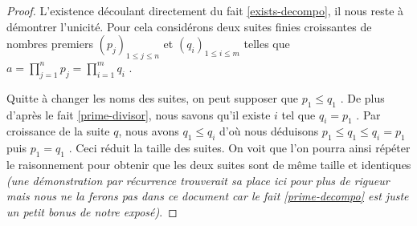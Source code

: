 \begin{proof}
	L'existence découlant directement du fait \ref{exists-decompo}, il nous reste à démontrer l'unicité.
	Pour cela considérons deux suites finies croissantes de nombres premiers
	$(p_j)_{1 \leq j \leq n}$
	et
	$(q_i)_{1 \leq i \leq m}$
	telles que $\displaystyle a = \prod_{j=1}^{n} p_j = \prod_{i=1}^{m} q_i$ .
	
	\smallskip
	
	Quitte à changer les noms des suites, on peut supposer que $p_1 \leq q_1$ .
	De plus d'après le fait \ref{prime-divisor}, nous savons qu'il existe $i$ tel que $q_i = p_1$ .
	Par croissance de la suite $q$, nous avons $q_1 \leq q_i$ d'où nous déduisons $p_1 \leq q_1 \leq q_i = p_1$ puis $p_1 = q_1$ .
	Ceci réduit la taille des suites. On voit que l'on pourra ainsi répéter le raisonnement pour obtenir que les deux suites sont de même taille et identiques \emph{(une démonstration par récurrence trouverait sa place ici pour plus de rigueur mais nous ne la ferons pas dans ce document car le fait \ref{prime-decompo} est juste un petit bonus de notre exposé)}.
\end{proof}
